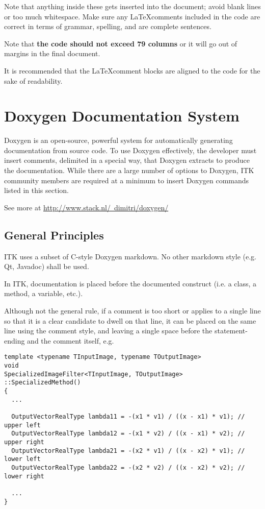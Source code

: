 Note that anything inside these gets inserted into the document; avoid blank
lines or too much whitespace. Make sure any \LaTeX comments included in the
code are correct in terms of grammar, spelling, and are complete sentences.

Note that \textbf{the code should not exceed 79 columns} or it will go out of
margins in the final document.

It is recommended that the \LaTeX comment blocks are aligned to the code for
the sake of readability.


\section{Doxygen Documentation System}
\label{sec:DoxygenDocumentationSystem}

Doxygen is an open-source, powerful system for automatically generating
documentation from source code. To use Doxygen effectively, the developer must
insert comments, delimited in a special way, that Doxygen extracts to produce
the documentation. While there are a large number of options to Doxygen,
ITK community members are required at a minimum to insert Doxygen commands
listed in this section.

See more at \href{http://www.stack.nl/~dimitri/doxygen/}
{http://www.stack.nl/~dimitri/doxygen/}


\subsection{General Principles}
\label{subsec:GeneralPrinciples}

ITK uses a subset of C-style Doxygen markdown. No other markdown style (e.g. Qt,
Javadoc) shall be used.

In ITK, documentation is placed before the documented construct (i.e. a class, a
method, a variable, etc.).

Although not the general rule, if a comment is too short or applies to a single
line so that it is a clear candidate to dwell on that line, it can be placed on
the same line using the \code{//} comment style, and leaving a single space
before the statement-ending \code{;} and the comment itself, e.g.

\small
\begin{verbatim}
template <typename TInputImage, typename TOutputImage>
void
SpecializedImageFilter<TInputImage, TOutputImage>
::SpecializedMethod()
{
  ...

  OutputVectorRealType lambda11 = -(x1 * v1) / ((x - x1) * v1); // upper left
  OutputVectorRealType lambda12 = -(x1 * v2) / ((x - x1) * v2); // upper right
  OutputVectorRealType lambda21 = -(x2 * v1) / ((x - x2) * v1); // lower left
  OutputVectorRealType lambda22 = -(x2 * v2) / ((x - x2) * v2); // lower right

  ...
}
\end{verbatim}
\normalsize

